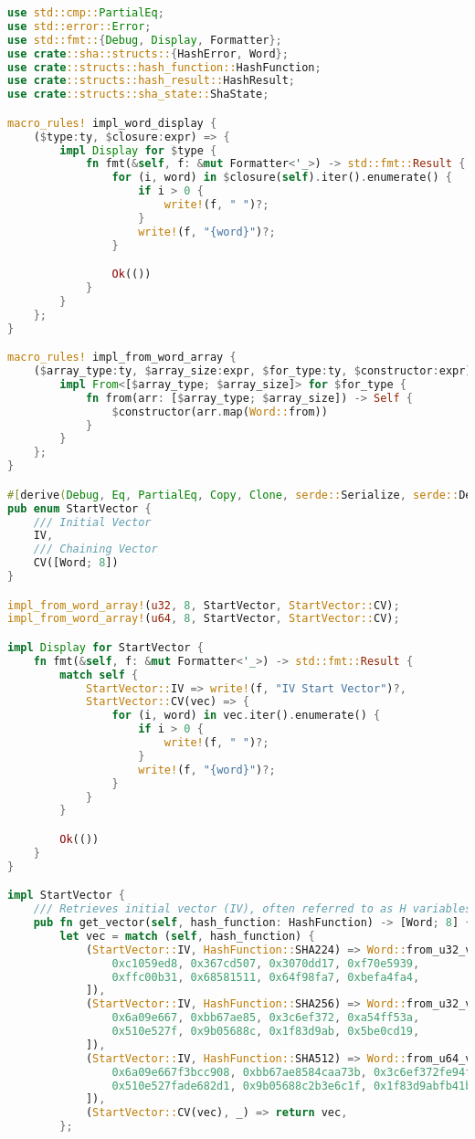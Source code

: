 \begin{lstlisting}[language=rust, caption={sha/sha.rs}]
use std::cmp::PartialEq;
use std::error::Error;
use std::fmt::{Debug, Display, Formatter};
use crate::sha::structs::{HashError, Word};
use crate::structs::hash_function::HashFunction;
use crate::structs::hash_result::HashResult;
use crate::structs::sha_state::ShaState;

macro_rules! impl_word_display {
    ($type:ty, $closure:expr) => {
        impl Display for $type {
            fn fmt(&self, f: &mut Formatter<'_>) -> std::fmt::Result {
                for (i, word) in $closure(self).iter().enumerate() {
                    if i > 0 {
                        write!(f, " ")?;
                    }
                    write!(f, "{word}")?;
                }

                Ok(())
            }
        }
    };
}

macro_rules! impl_from_word_array {
    ($array_type:ty, $array_size:expr, $for_type:ty, $constructor:expr) => {
        impl From<[$array_type; $array_size]> for $for_type {
            fn from(arr: [$array_type; $array_size]) -> Self {
                $constructor(arr.map(Word::from))
            }
        }
    };
}

#[derive(Debug, Eq, PartialEq, Copy, Clone, serde::Serialize, serde::Deserialize)]
pub enum StartVector {
	/// Initial Vector
	IV,
	/// Chaining Vector
	CV([Word; 8])
}

impl_from_word_array!(u32, 8, StartVector, StartVector::CV);
impl_from_word_array!(u64, 8, StartVector, StartVector::CV);

impl Display for StartVector {
	fn fmt(&self, f: &mut Formatter<'_>) -> std::fmt::Result {
		match self {
			StartVector::IV => write!(f, "IV Start Vector")?,
			StartVector::CV(vec) => {
				for (i, word) in vec.iter().enumerate() {
					if i > 0 {
						write!(f, " ")?;
					}
					write!(f, "{word}")?;
				}
			}
		}

		Ok(())
	}
}

impl StartVector {
	/// Retrieves initial vector (IV), often referred to as H variables
	pub fn get_vector(self, hash_function: HashFunction) -> [Word; 8] {
		let vec = match (self, hash_function) {
			(StartVector::IV, HashFunction::SHA224) => Word::from_u32_vec(vec![
				0xc1059ed8, 0x367cd507, 0x3070dd17, 0xf70e5939,
				0xffc00b31, 0x68581511, 0x64f98fa7, 0xbefa4fa4,
			]),
			(StartVector::IV, HashFunction::SHA256) => Word::from_u32_vec(vec![
				0x6a09e667, 0xbb67ae85, 0x3c6ef372, 0xa54ff53a,
				0x510e527f, 0x9b05688c, 0x1f83d9ab, 0x5be0cd19,
			]),
			(StartVector::IV, HashFunction::SHA512) => Word::from_u64_vec(vec![
				0x6a09e667f3bcc908, 0xbb67ae8584caa73b, 0x3c6ef372fe94f82b, 0xa54ff53a5f1d36f1,
				0x510e527fade682d1, 0x9b05688c2b3e6c1f, 0x1f83d9abfb41bd6b, 0x5be0cd19137e2179,
			]),
			(StartVector::CV(vec), _) => return vec,
		};


\end{lstlisting}
